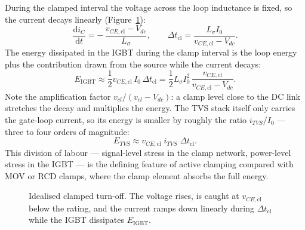 \documentclass[11pt,a4paper]{article}
\newcommand{\ud}{\mathrm{d}}
\begin{document}
During the clamped interval the voltage across the loop inductance is
fixed, so the current decays linearly (Figure~\ref{fig:wave}):
%
\begin{equation}
  \frac{\ud i_C}{\ud t}
  = -\,\frac{v_{CE,\mathrm{cl}} - V_{dc}}{L_\sigma},
  \qquad
  \Delta t_{\mathrm{cl}} = \frac{L_\sigma I_0}{v_{CE,\mathrm{cl}} - V_{dc}} .
  \label{eq:didt}
\end{equation}
%
The energy dissipated in the IGBT during the clamp interval is the loop
energy plus the contribution drawn from the source while the current
decays:
%
\begin{equation}
  E_{\mathrm{IGBT}}
  \approx \frac{1}{2} v_{CE,\mathrm{cl}}\, I_0\, \Delta t_{\mathrm{cl}}
  = \frac{1}{2} L_\sigma I_0^2 \,
    \frac{v_{CE,\mathrm{cl}}}{v_{CE,\mathrm{cl}} - V_{dc}} .
  \label{eq:eigbt}
\end{equation}
%
Note the amplification factor $v_{cl}/(v_{cl}-V_{dc})$: a clamp level
close to the DC link stretches the decay and multiplies the energy. The
TVS stack itself only carries the gate-loop current, so its energy is
smaller by roughly the ratio $i_{TVS}/I_0$ --- three to four orders of
magnitude:
%
\begin{equation}
  E_{TVS} \approx v_{CE,\mathrm{cl}}\; i_{TVS}\; \Delta t_{\mathrm{cl}} .
  \label{eq:etvs}
\end{equation}
%
This division of labour --- signal-level stress in the clamp network,
power-level stress in the IGBT --- is the defining feature of active
clamping compared with MOV or RCD clamps, where the clamp element
absorbs the full energy.

\begin{figure}[htb]
\centering
{}
\caption{Idealised clamped turn-off. The voltage rises, is caught at
$v_{CE,\mathrm{cl}}$ below the rating, and the current ramps down
linearly during $\Delta t_{\mathrm{cl}}$ while the IGBT dissipates
$E_{\mathrm{IGBT}}$.}
\label{fig:wave}
\end{figure}
\end{document}
